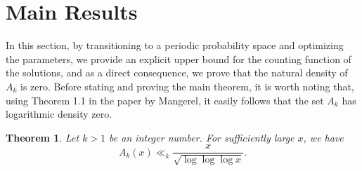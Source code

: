 \documentclass[12pt, a4paper]{article}
\theoremstyle{plain}
\newtheorem{theorem}{Theorem}[section]
\theoremstyle{definition}
\begin{document}
\section{Main Results}
In this section, by transitioning to a periodic probability space and optimizing the parameters, we provide an explicit upper bound for the counting function of the solutions, and as a direct consequence, we prove that the natural density of $A_k$ is zero. Before stating and proving the main theorem, it is worth noting that, using Theorem 1.1 in the paper by Mangerel, it easily follows that the set $A_k$ has logarithmic density zero.

\begin{theorem}
Let $k > 1$ be an integer number. For sufficiently large $x$, we have
\[ A_k(x) \ll_k \frac{x}{\sqrt{\log \log \log x}}. \]
\end{theorem}
\end{document}
